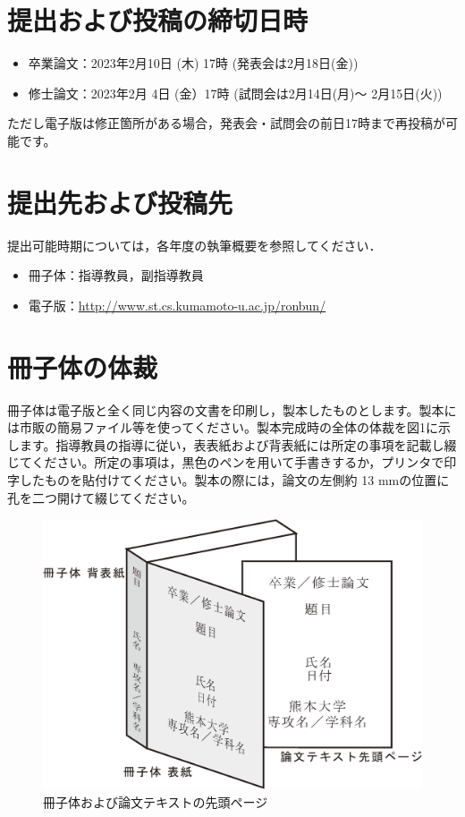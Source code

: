 \documentclass{kupaper}
\begin{document}
\chapter{提出および投稿の締切日時}
\begin{itemize}
	\item 卒業論文：2023年2月10日 (木) 17時 (発表会は2月18日(金))
	\item 修士論文：2023年2月 4日 (金）17時 (試問会は2月14日(月)～ 2月15日(火))
\end{itemize}
ただし電子版は修正箇所がある場合，発表会・試問会の前日17時まで再投稿が可能です。

\chapter{提出先および投稿先}
提出可能時期については，各年度の執筆概要を参照してください．
\begin{itemize}
	\item 冊子体：指導教員，副指導教員
	\item 電子版：\url{http://www.st.cs.kumamoto-u.ac.jp/ronbun/} 
\end{itemize}

\chapter{冊子体の体裁}



冊子体は電子版と全く同じ内容の文書を印刷し，製本したものとします。製本には市販の簡易ファイル等を使ってください。製本完成時の全体の体裁を図1に示します。指導教員の指導に従い，表表紙および背表紙には所定の事項を記載し綴じてください。所定の事項は，黒色のペンを用いて手書きするか，プリンタで印字したものを貼付けてください。製本の際には，論文の左側約 13 mmの位置に孔を二つ開けて綴じてください。

\begin{figure}[htbp]
	\centering
	\includegraphics[width=1.0\linewidth,keepaspectratio]{book.eps}
	\caption{冊子体および論文テキストの先頭ページ}
	\label{overview}
\end{figure}
\end{document}

